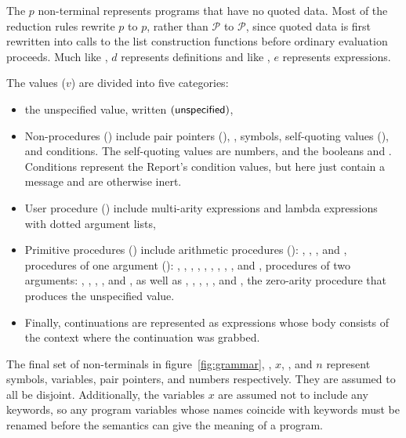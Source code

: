 The $p$ non-terminal represents programs that have no quoted
data. Most of the reduction rules rewrite $p$ to $p$,
rather than $\mathcal{P}$ to $\mathcal{P}$, since quoted data is first
rewritten into calls to the list construction functions before
ordinary evaluation proceeds. Much like , $d$
represents definitions and like , $e$ represents
expressions.

The values ($v$) are divided into five categories:
%
\begin{itemize}
\item the unspecified value, written $(\textnormal{\textsf{unspecified}})$,
\item Non-procedures () include pair pointers
  (), , symbols, self-quoting values
  (), and conditions. The self-quoting values are numbers,
  and the booleans \semtrue{} and \semfalse{}. Conditions represent
  the Report's condition values, but here just contain a message and
  are otherwise inert.
\item User procedure () include multi-arity
   expressions and lambda expressions with dotted
  argument lists,
\item Primitive procedures () include arithmetic procedures
  (): \va{+}, \va{-}, \va{/}, and \va{*}, procedures of one
  argument (): , , , ,
  , , , , , and , procedures of
  two arguments: , , , ,
  and , as well as , ,
  , , , and , the zero-arity
  procedure that produces the unspecified value.
\item Finally, continuations are represented as  expressions
  whose body consists of the context where the continuation was
  grabbed.
\end{itemize}
%
The final set of non-terminals in figure~\ref{fig:grammar}, ,
$x$, , and $n$ represent symbols, variables, pair pointers, and
numbers respectively. They are assumed to all be disjoint.
Additionally, the variables $x$ are assumed not to include any
keywords, so any program variables whose names coincide with keywords
must be renamed before the semantics can give the meaning of a
program.

